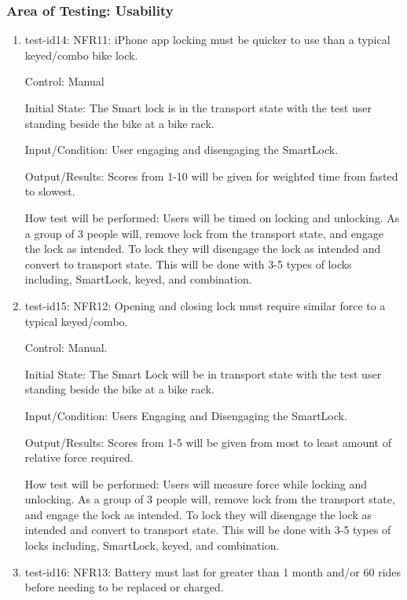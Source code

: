 \documentclass[12pt, titlepage]{article}
\begin{document}
\subsubsection{Area of Testing: Usability}

\begin{enumerate}

\item{test-id14: NFR11: iPhone app locking must be quicker to use than a typical keyed/combo bike lock.  \\}

Control: Manual 

Initial State: The Smart lock is in the transport state with the test user standing beside the bike at a bike rack.

Input/Condition: User engaging and disengaging the SmartLock.

Output/Results: Scores from 1-10 will be given for weighted time from fasted to slowest.

How test will be performed: Users will be timed on locking and unlocking. As a group of 3 people will, remove lock from the transport state, and engage the lock as intended. To lock they will disengage the lock as intended and convert to transport state. This will be done with 3-5 types of locks including, SmartLock, keyed, and combination.

\item{test-id15: NFR12: Opening and closing lock must require similar force to a typical keyed/combo.  \\}

Control: Manual.

Initial State: The Smart Lock will be in transport state with the test user standing beside the bike at a bike rack.

Input/Condition: Users Engaging and Disengaging the SmartLock.

Output/Results: Scores from 1-5 will be given from most to least amount of relative force required.

How test will be performed: Users will measure force while locking and unlocking. As a group of 3 people will, remove lock from the transport state, and engage the lock as intended. To lock they will disengage the lock as intended and convert to transport state. This will be done with 3-5 types of locks including, SmartLock, keyed, and combination.

\item{test-id16: NFR13: Battery must last for greater than 1 month and/or 60 rides before needing to be replaced or charged.  \\}


\end{enumerate}
\end{document}
